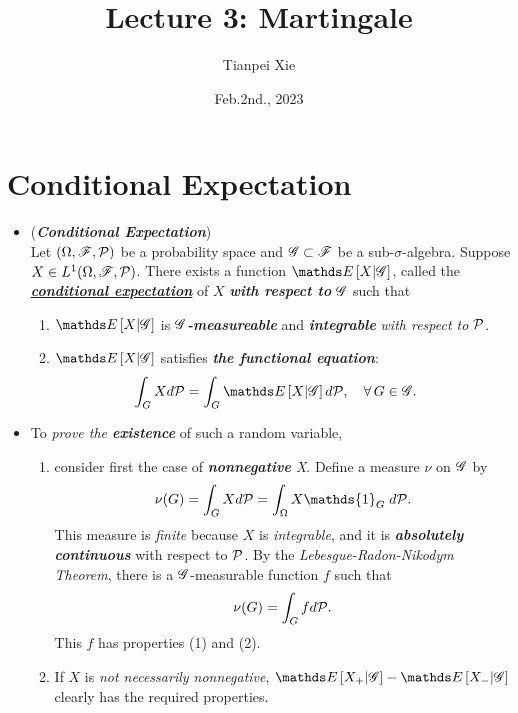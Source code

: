 \documentclass[11pt]{article}
\begin{document}
\title{Lecture 3: Martingale}
\author{ Tianpei Xie}
\date{ Feb.2nd., 2023 }
\maketitle
\tableofcontents
\newpage
\section{Conditional Expectation}
\begin{itemize}
\item \begin{definition} (\emph{\textbf{Conditional Expectation}}) \citep{resnick2013probability}\\
Let $(\Omega, {\mathscr F}, {\mathcal P})$ be a probability space and ${\mathscr G} \subset {\mathscr F}$ be a sub-$\sigma$-algebra. Suppose $X\in  L^{1}(\Omega, {\mathscr F}, {\mathcal P})$. There exists a function $\E{}{X| \srG}$, called the \underline{\emph{\textbf{conditional expectation}}} of $X$ \emph{\textbf{with respect to}} ${\mathscr G}$ such that
\begin{enumerate}
\item $\E{}{X| \srG}$ is \emph{\textbf{${\mathscr G}$-measureable}} and \emph{\textbf{integrable}} \emph{with respect to} ${\mathcal P}$. 

\item $\E{}{X| \srG}$ satisfies \emph{\textbf{the functional equation}}: 
\begin{align*}
\int_{G} X d\cP &= \int_{G} \E{}{X| \srG} d\cP, \quad \forall\, G \in \srG.
\end{align*}
\end{enumerate}
\end{definition}

\item \begin{remark}
To \emph{prove the \textbf{existence}} of such a random variable, 
\begin{enumerate}
\item consider first the case of
\emph{\textbf{nonnegative} X}. Define a measure $\nu$ on ${\mathscr G}$ by 
\begin{align*}
\nu(G) = \int_{G} X d\cP = \int_{\Omega} X \mathds{1}_{G}\; d\cP.
\end{align*}
This measure is \emph{finite} because $X$ is \emph{integrable}, and it is \emph{\textbf{absolutely continuous}} with respect to ${\mathcal P}$. By the \emph{Lebesgue-Radon-Nikodym Theorem},  there is a ${\mathscr G}$-measurable function $f$
such that 
\begin{align*}
\nu(G) = \int_{G} f d{\mathcal P}.
\end{align*}
This $f$ has properties (1) and (2). 
\item If $X$ is \emph{not necessarily nonnegative}, $\E{}{X_{+}| \srG} - \E{}{X_{-}| \srG}$ clearly has the required properties.
\end{enumerate}
\end{remark}


\end{itemize}
\end{document}
